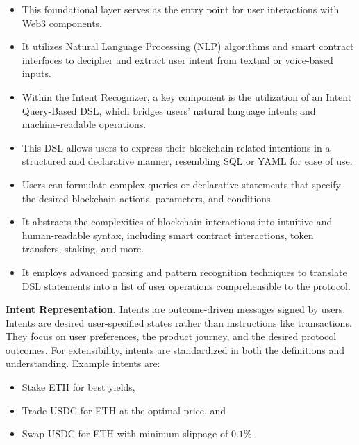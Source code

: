 \documentclass[11pt,letterpaper,twocolumn]{article}
\begin{document}
\begin{itemize}

\item This foundational layer serves as the entry point for user interactions with Web3 components.

\item It utilizes Natural Language Processing (NLP) algorithms and smart contract interfaces to decipher and extract user intent from textual or voice-based inputs.

\item Within the Intent Recognizer, a key component is the utilization of an Intent Query-Based DSL, which bridges users' natural language intents and machine-readable operations.

\item This DSL allows users to express their blockchain-related intentions in a structured and declarative manner, resembling SQL or YAML for ease of use.

\item Users can formulate complex queries or declarative statements that specify the desired blockchain actions, parameters, and conditions.

\item It abstracts the complexities of blockchain interactions into intuitive and human-readable syntax, including smart contract interactions, token transfers, staking, and more.

\item It employs advanced parsing and pattern recognition techniques to translate DSL statements into a list of user operations comprehensible to the protocol.

\end{itemize}
\newline
\newline
\noindent \textbf{Intent Representation.}
Intents are outcome-driven messages signed by users. Intents are desired user-specified states rather than instructions like transactions. They focus on user preferences, the product journey, and the desired protocol outcomes. For extensibility, intents are standardized in both the definitions and understanding. Example intents are:
\begin{itemize}
\item Stake ETH for best yields,
\item Trade USDC for ETH at the optimal price, and
\item Swap USDC for ETH with minimum slippage of $0.1\%$.
\end{itemize}
\end{document}
